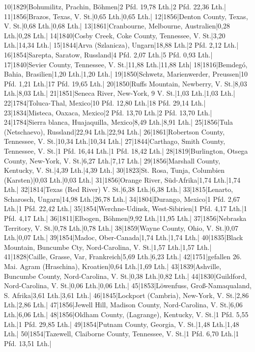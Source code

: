 \documentclass[a4paper, 11pt, oneside]{article}
\begin{document}
10|1829|Bohumilitz, Prachin, Böhmen|2 Pfd. 19,78 Lth.|2 Pfd. 22,36 Lth.|  
11|1856|Brazos, Texas, V. St.|0,65 Lth.|0,65 Lth.|  
12|1856|Denton County, Texas, V. St.|0,68 Lth.|0,68 Lth.|  
13|1861|Cranbourne, Melbourne, Australien|0,28 Lth.|0,28 Lth.|  
14|1840|Cosby Creek, Coke County, Tennessee, V. St.|3,20 Lth.|14,34 Lth.|  
15|1844|Arva (Szlanicza), Ungarn|18,88 Lth.|2 Pfd. 2,12 Lth.|  
16|1854|Sarepta, Saratow, Russland|4 Pfd. 2,07 Lth.|5 Pfd. 0,93 Lth.|  
17|1840|Sevier County, Tennessee, V. St.|11,88 Lth.|11,88 Lth|  
18|1816|Bemdegó, Bahia, Brasilien|1,20 Lth.|1,20 Lth.|  
19|1850|Schwetz, Marienwerder, Preussen|10 Pfd. 1,21 Lth.|17 Pfd. 19,65 Lth.|  
20|1850|Ruffs Mountain, Newberry, V. St.|8,03 Lth.|8,03 Lth.|  
21|1851|Seneca River, New-York, 9 V. St.|1,03 Lth.|1,03 Lth.|  
22|1784|Toluca-Thal, Mexico|10 Pfd. 12,80 Lth.|18 Pfd. 29,14 Lth.|  
23|1834|Misteca, Oaxaca, Mexico|2 Pfd. 13,70 Lth.|2 Pfd. 13,70 Lth.|  
24|1784|Sierra blanca, Huajaquilla, Mexico|8,49 Lth.|8,91 Lth.|  
25|1856|Tula (Netschaevo), Russland|22,94 Lth.|22,94 Lth.|  
26|1861|Robertson County, Tennessee, V. St.|10,34 Lth.|10,34 Lth.|  
27|1844|Carthago, Smith County, Tennessee, V. St.|1 Pfd. 16,44 Lth.|1 Pfd. 18,42 Lth.|  
28|1819|Burlington, Otsega County, New-York, V. St.|6,27 Lth.|7,17 Lth.|  
29|1856|Marshall County, Kentucky, V. St.|4,39 Lth.|4,39 Lth.|  
30|1823|St. Rosa, Tunja, Columbien (Karsten)|0,03 Lth.|0,03 Lth.|  
31|1856|Orange River, Süd-Afrika|1,74 Lth.|1,74 Lth.|  
32|1814|Texas (Red River) V. St.|6,38 Lth.|6,38 Lth.|  
33|1815|Lenarto, Scharosch, Ungarn|14,98 Lth.|26,78 Lth.|  
34|1804|Durango, Mexico|1 Pfd. 2,67 Lth.|1 Pfd. 22,42 Lth.|  
35|1854|Werchne-Udinsk, West-Sibirien|1 Pfd. 4,17 Lth.|1 Pfd. 4,17 Lth.|  
36|1811|Elbogen, Böhmen|9,92 Lth.|11,95 Lth.|  
37|1856|Nebraska Territory, V. St.|0,78 Lth.|0,78 Lth.|  
38|1859|Wayne County, Ohio, V. St.|0,07 Lth.|0,07 Lth.|  
39|1854|Madoc, Ober-Canada|1,74 Lth.|1,74 Lth.|  
40|1835|Black Mountain, Buncumbe Cty, Nord-Carolina, V. St.|1,57 Lth.|1,57 Lth.|  
41|1828|Caille, Grasse, Var, Frankreich|5,69 Lth.|6,23 Lth.|  
42|1751|gefallen 26. Mai. Agram (Hraschina), Kroatien|0,64 Lth.|1,69 Lth.|  
43|1839|Ashville, Buncumbe County, Nord-Carolina, V. St.|0,38 Lth.|0,82 Lth.|  
44|1830|Guildford, Nord-Carolina, V. St.|0,06 Lth.|0,06 Lth.|  
45|1853|Löwenfuss, Groß-Namaqualand, S. Afrika|3,61 Lth.|3,61 Lth.|  
46|1845|Lockport (Cambria), New-York, V. St.|2,86 Lth.|2,86 Lth.|  
47|1856|Jewell Hill, Madison County, Nord-Carolina, V. St.|6,06 Lth.|6,06 Lth.|  
48|1856|Oldham County, (Lagrange), Kentucky, V. St.|1 Pfd. 5,55 Lth.|1 Pfd. 29,85 Lth.|  
49|1854|Putnam County, Georgia, V. St.|1,48 Lth.|1,48 Lth.|  
50|1854|Tazewell, Claiborne County, Tennessee, V. St.|1 Pfd. 6,70 Lth.|1 Pfd. 13,51 Lth.|  
\end{document}
